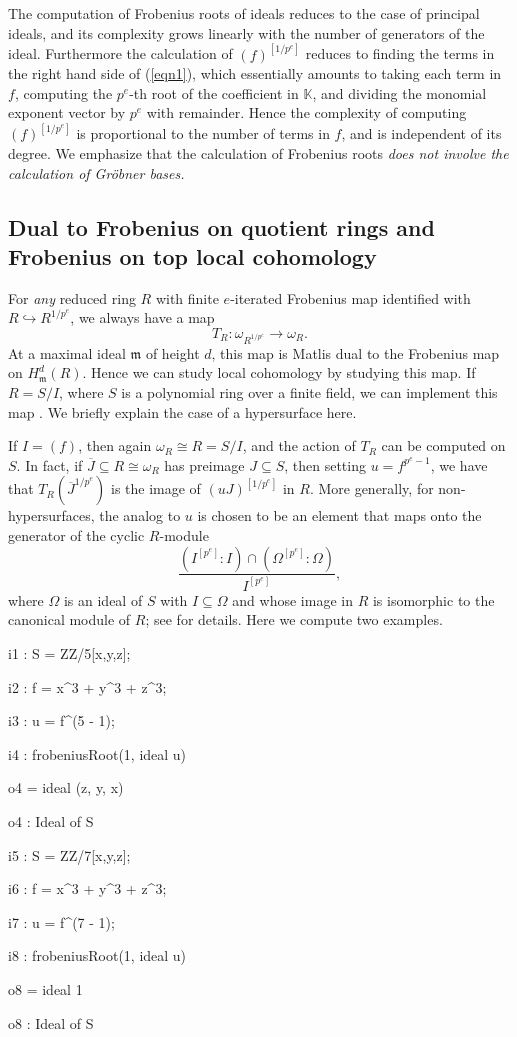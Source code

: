 \documentclass{amsart}
\newcommand{\fram}{\mathfrak{m}}
\begin{document}
The computation of Frobenius roots of ideals reduces to the case of principal ideals, and its complexity grows linearly with the number of generators of the ideal.
Furthermore the calculation of  $(f)^{[1/p^e]}$ reduces to finding the terms in the right hand side of (\ref{eqn1}), which essentially amounts to
taking each term in $f$, computing the $p^e$-th root of the coefficient in $\mathbb{K}$, and dividing the monomial exponent vector by $p^e$ with remainder.
Hence the complexity of computing $(f)^{[1/p^e]}$ is proportional to the number of terms in $f$, and is independent of its degree.
We emphasize that the calculation of Frobenius roots \emph{does not involve the calculation of Gr\"obner bases.}

\subsection{Dual to Frobenius on quotient rings and Frobenius on top local cohomology}
\label{subsec.DualToFrobeniusOnQuotientRings}
For \emph{any} reduced ring $R$ with finite $e$-iterated Frobenius map identified with $R \hookrightarrow R^{1/p^e}$, we always have a map
\[
T_R : \omega_{R^{1/p^e}} \to \omega_R.
\]
At a maximal ideal $\fram$ of height $d$, this map is Matlis dual to the Frobenius map on $H^d_{\fram}(R)$.
Hence we can study local cohomology by studying this map.
If $R = S/I$, where $S$ is a polynomial ring over a finite field, we can implement this map \cite{FedderFPureRat, KatzmanParameterTestIdealOfCMRings}.  We briefly explain the case of a hypersurface here.

If $I = (f)$, then again $\omega_R \cong R = S/I$, and the action of $T_R$ can be computed on $S$.  In fact, if $\overline{J} \subseteq R \cong \omega_R$ has preimage  $J \subseteq S$,
then setting $u = f^{p^e-1}$, we have that $T_R({\overline J}^{1/p^e})$ is the image of $(u J)^{[1/p^e]}$ in $R$.
More generally, for non-hypersurfaces, the analog to $u$ is chosen to be an element that maps onto the generator of the cyclic $R$-module
\[
\frac{(I^{[p^e]} : I) \cap (\Omega^{[p^e]} : \Omega)}{ I^{[p^e]}},
\]
where $\Omega$ is an ideal of $S$ with $I\subseteq \Omega$ and whose image in $R$ is isomorphic to the canonical module of $R$; see \cite{KatzmanParameterTestIdealOfCMRings} for details.
Here we compute two examples.

\medskip
{\small
\begin{MyVerbatim}
i1 : S = ZZ/5[x,y,z];

i2 : f = x^3 + y^3 + z^3;

i3 : u = f^(5 - 1);

i4 : frobeniusRoot(1, ideal u)

o4 = ideal (z, y, x)

o4 : Ideal of S

i5 : S = ZZ/7[x,y,z];

i6 : f = x^3 + y^3 + z^3;

i7 : u = f^(7 - 1);

i8 : frobeniusRoot(1, ideal u)

o8 = ideal 1

o8 : Ideal of S
\end{MyVerbatim}
}\medskip
\end{document}
